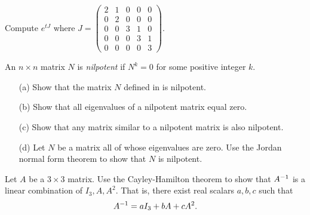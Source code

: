 \documentclass{ximera}
\begin{document}
\begin{exercise}  \label{c10.5.5B}
Compute $e^{tJ}$ where $J=\left(\begin{array}{rrrrr} 2 & 1 & 0 & 0 & 0\\  
0 & 2 & 0 & 0 & 0 \\ 0 & 0 & 3 & 1 & 0\\ 0 & 0 & 0 & 3 & 1\\
0 & 0 & 0 & 0 & 3 \end{array}\right)$.
\end{exercise}

\begin{exercise} \label{c10.5.5}
An $n\times n$ matrix $N$ is 
{\em nilpotent\/} 
if $N^k=0$ for some positive integer $k$.
\begin{itemize}
\item[(a)]  Show that the matrix $N$ defined in  is nilpotent.
\item[(b)]  Show that all eigenvalues of a nilpotent matrix equal zero.
\item[(c)]  Show that any matrix similar to a nilpotent matrix is also 
	nilpotent.
\item[(d)]  Let $N$ be a matrix all of whose eigenvalues are zero.  Use 
	the Jordan normal form theorem to show that $N$ is nilpotent.
\end{itemize}
\end{exercise}

\begin{exercise} \label{c10.5.5C}
Let $A$ be a $3\times 3$ matrix.  Use the Cayley-Hamilton theorem to show that
$A^{-1}$ is a linear combination of $I_3,A,A^2$.  That is, there exist real 
scalars $a,b,c$ such that 
\[
A^{-1} = aI_3 + bA + cA^2.
\]
\end{exercise}

\CEXER
\end{document}
